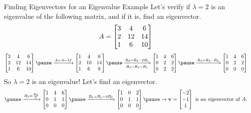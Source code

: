 \documentclass[xcoler=dvipsnames, aspectratio=169]{beamer}
\begin{document}
    \begin{frame}{Finding Eigenvectors for an Eigenvalue Example}
        Let's verify if $\lambda=2$ is an eigenvalue of the following matrix, and if it is, 
        find an eigenvector.
        \[
            A = \begin{bmatrix}
                3 & 4 & 6\\
                2 & 12&14\\
                1 & 6 &10
            \end{bmatrix}
        \]\pause
        \[
            \bMat{
                3 & 4 & 6\\
                2 & 12&14\\
                1 & 6 &10
            }\pause\xrightarrow{A=A-\lambda I}\bMat{
                1 & 4 & 6\\
                2 & 10&14\\
                1 & 6 &8
            }\pause\xrightarrow[R_3=R_3-R_1]{R_2=R_2-2R_1}\bMat{
                1 & 4 & 6\\
                0 & 2 & 2\\
                0 & 2 & 2
            }\pause\xrightarrow{R_3=R_3-R_2}\bMat{
                1 & 4 & 6\\
                0 & 2 & 2\\
                0 & 0 & 0
            }
        \]
        So $\lambda=2$ is an eigenvalue! Let's find an eigenvector.
        \[
            \pause\xrightarrow{R_2=\frac{R_2}{2}}\bMat{
                1 & 4 & 6\\
                0 & 1 & 1\\
                0 & 0 & 0
            }\pause\xrightarrow{R_1=R_1-4R_2}\bMat{
                1 & 0 & 2\\
                0 & 1 & 1\\
                0 & 0 & 0
            }\pause\rightarrow \vec{v} = \bMat{-2\\-1\\1}\textnormal{ is an eigenvector of }A.
        \]

    \end{frame}
\end{document}
